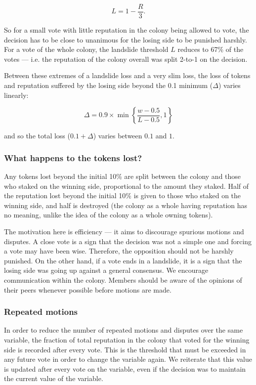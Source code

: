 \begin{equation}
L = 1 - \frac{R}{3}.
\end{equation}

So for a small vote with little reputation in the colony being allowed to vote, the decision has to be close to unanimous for the losing side to be punished harshly. For a vote of the whole colony, the landslide threshold $L$ reduces to 67\% of the votes --- i.e. the reputation of the colony overall was split 2-to-1 on the decision.

Between these extremes of a landslide loss and a very slim loss, the loss of tokens and reputation suffered by the losing side beyond the 0.1 minimum ($\Delta$) varies linearly:

\begin{equation}
 \Delta = 0.9 \times \min \left\lbrace \frac{w-0.5}{L-0.5}, 1 \right\rbrace
\end{equation}

\noindent and so the total loss ($0.1 + \Delta$) varies between $0.1$ and $1$.

\subsubsection*{What happens to the tokens lost?}

Any tokens lost beyond the initial 10\% are split between the colony and those who staked on the winning side, proportional to the amount they staked. Half of the reputation lost beyond the initial 10\% is given to those who staked on the winning side, and half is destroyed (the colony as a whole having reputation has no meaning, unlike the idea of the colony as a whole owning tokens).

The motivation here is efficiency --- it aims to discourage spurious motions and disputes. A close vote is a sign that the decision was not a simple one and forcing a vote may have been wise. Therefore, the opposition should not be harshly punished. On the other hand, if a vote ends in a landslide, it is a sign that the losing side was going up against a general consensus. We encourage communication within the colony. Members should be aware of the opinions of their peers whenever possible before motions are made.

\subsubsection*{Repeated motions}

In order to reduce the number of repeated motions and disputes over the same variable, the fraction of total reputation in the colony that voted for the winning side is recorded after every vote. This is the threshold that must be exceeded in any future vote in order to change the variable again. We reiterate that this value is updated after every vote on the variable, even if the decision was to maintain the current value of the variable.

